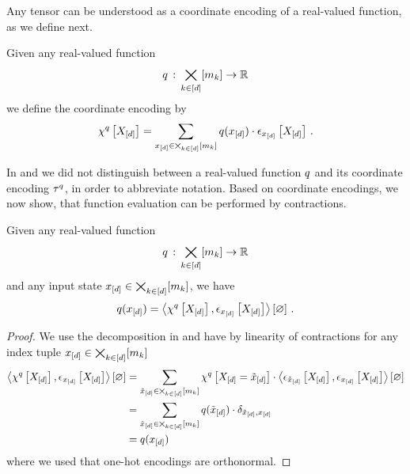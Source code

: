 Any tensor can be understood as a coordinate encoding of a real-valued function, as we define next.

\begin{definition}\label{def:coordinateEncoding}
    Given any real-valued function
    \begin{align*}
        q \,:\, \bigtimes_{k\in[d]}[m_{k}] \rightarrow \mathbb{R}
    \end{align*}
    we define the coordinate encoding by
    \begin{align*}
        \chi^{q}\left[X_{[d]}\right]
        = \sum_{x_{[d]}\in\bigtimes_{k\in[d]}[m_{k}]} q(x_{[d]}) \cdot \epsilon_{x_{[d]}}\left[X_{[d]}\right] \, .
    \end{align*}
\end{definition}

In  and  we did not distinguish between a real-valued function $q$ and its coordinate encoding $\tau^{q}$, in order to abbreviate notation.
Based on coordinate encodings, we now show, that function evaluation can be performed by contractions.

\begin{theorem}
    \label{the:coordinateCalculus}
    Given any real-valued function
    \begin{align*}
        q \,:\, \bigtimes_{k\in[d]}[m_{k}] \rightarrow \mathbb{R}
    \end{align*}
    and any input state $x_{[d]}\in\bigtimes_{k\in[d]}[m_{k}]$, we have
    \begin{align*}
        q(x_{[d]})
        = \left\langle \chi^{q}\left[X_{[d]}\right],\epsilon_{x_{[d]}}\left[X_{[d]}\right]\right\rangle \left[ \varnothing \right] \, .
    \end{align*}
\end{theorem}
\begin{proof}
    We use the decomposition in  and have by linearity of contractions for any index tuple $x_{[d]}\in\bigtimes_{k\in[d]}[m_{k}]$
    \begin{align*}
        \left\langle \chi^{q}\left[X_{[d]}\right],\epsilon_{x_{[d]}}\left[X_{[d]}\right]\right\rangle \left[ \varnothing \right]
        & = \sum_{\tilde{x}_{[d]}\in\bigtimes_{k\in[d]}[m_{k}]}
        \chi^{q}\left[X_{[d]}=\tilde{x}_{[d]}\right]
        \cdot \left\langle \epsilon_{\tilde{x}_{[d]}}\left[X_{[d]}\right],\epsilon_{x_{[d]}}\left[X_{[d]}\right]\right\rangle \left[ \varnothing \right] \\
        & = \sum_{\tilde{x}_{[d]}\in\bigtimes_{k\in[d]}[m_{k}]}
        q(\tilde{x}_{[d]})
        \cdot \delta_{\tilde{x}_{[d]},x_{[d]}} \\
        & = q(x_{[d]})
    \end{align*}
    where we used that one-hot encodings are orthonormal.
\end{proof}


